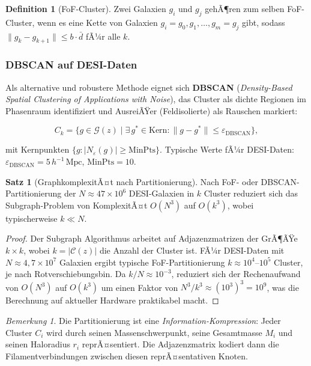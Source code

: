 ﻿\documentclass[a4paper,12pt]{article}
\theoremstyle{definition}
\newtheorem{definition}{Definition}[section]
\newtheorem{satz}{Satz}[section]
\theoremstyle{remark}
\newtheorem{bemerkung}{Bemerkung}[section]
\begin{document}
\begin{definition}[FoF-Cluster]
  Zwei Galaxien $g_i$ und $g_j$ gehÃ¶ren zum selben FoF-Cluster, wenn es eine
  Kette von Galaxien $g_i = g_0, g_1, \ldots, g_m = g_j$ gibt, sodass
  $\|g_k - g_{k+1}\| \leq b\cdot\bar{d}$ fÃ¼r alle $k$.
\end{definition}

\subsubsection*{DBSCAN auf DESI-Daten}

Als alternative und robustere Methode eignet sich \textbf{DBSCAN}
(\textit{Density-Based Spatial Clustering of Applications with Noise}),
das Cluster als dichte Regionen im Phasenraum identifiziert und
AusreiÃŸer (Feldisolierte) als Rauschen markiert:

\begin{equation}
  \label{eq:dbscan}
  C_k = \bigl\{g \in \mathcal{G}(z) \mid \exists\,g^* \in \text{Kern}:
        \|g - g^*\| \leq \varepsilon_\mathrm{DBSCAN}\bigr\},
\end{equation}

mit Kernpunkten $\{g : |N_\varepsilon(g)| \geq \mathrm{MinPts}\}$.
Typische Werte fÃ¼r DESI-Daten: $\varepsilon_\mathrm{DBSCAN} = 5\,h^{-1}\,\mathrm{Mpc}$,
$\mathrm{MinPts} = 10$.

\begin{satz}[GraphkomplexitÃ¤t nach Partitionierung]
  \label{satz:graph_complexity}
  Nach FoF- oder DBSCAN-Partitionie\-rung der $N \approx 47 \times 10^6$ DESI-Galaxien
  in $k$ Cluster reduziert sich das Subgraph-Problem von KomplexitÃ¤t
  $O(N^3)$ auf $O(k^3)$, wobei typischerweise
  $k \ll N$.
\end{satz}

\begin{proof}
  Der Subgraph Algorithmus \cite{eppsubgraph2026} arbeitet auf Adjazenzmatrizen
  der GrÃ¶ÃŸe $k \times k$, wobei $k = |\mathcal{C}(z)|$ die Anzahl der Cluster ist.
  FÃ¼r DESI-Daten mit $N \approx 4{,}7 \times 10^7$ Galaxien ergibt typische
  FoF-Partitionierung $k \approx 10^4$--$10^5$ Cluster, je nach Rotverschiebungsbin.
  Da $k/N \approx 10^{-3}$, reduziert sich der Rechenaufwand von $O(N^3)$
  auf $O(k^3)$ um einen Faktor von $N^3/k^3 \approx (10^3)^3 = 10^9$, was die
  Berechnung auf aktueller Hardware praktikabel macht.
\end{proof}

\begin{bemerkung}
  Die Partitionierung ist eine \textit{Information-Kompression}: Jeder Cluster
  $C_i$ wird durch seinen Massenschwerpunkt, seine Gesamtmasse $M_i$ und
  seinen Haloradius $r_i$ reprÃ¤sentiert. Die Adjazenzmatrix kodiert dann
  die Filamentverbindungen zwischen diesen reprÃ¤sentativen Knoten.
\end{bemerkung}
\end{document}
